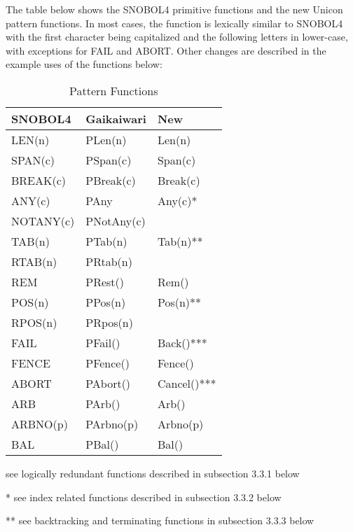 \documentclass{article}
\begin{document}
The table below shows the SNOBOL4 primitive functions and the new Unicon pattern functions.  In most cases, the function is lexically similar to SNOBOL4 with the first character being capitalized and the following letters in lower-case, with exceptions for FAIL and ABORT.  Other changes are described in the example uses of the functions below: 

\begin{table}[ht]
	\centering
	\caption{Pattern Functions}
	\begin{threeparttable}
		\centering
		\begin{tabular}{|l|l|l|}
			\hline\hline
			SNOBOL4 & Gaikaiwari & New \\
			\hline
			LEN(n) & PLen(n) & Len(n) \\
			SPAN(c) & PSpan(c) & Span(c)  \\
			BREAK(c) & PBreak(c) & Break(c) \\
			ANY(c) & PAny & Any(c)* \\
			NOTANY(c) & PNotAny(c) &  \\
			TAB(n) & PTab(n) & Tab(n)** \\
			RTAB(n) & PRtab(n) &  \\
			REM & PRest() & Rem() \\
			POS(n) & PPos(n) & Pos(n)**  \\
			RPOS(n) & PRpos(n) &  \\
			FAIL & PFail() & Back()*** \\
			FENCE & PFence() & Fence() \\
			ABORT & PAbort() & Cancel()*** \\
			ARB & PArb() & Arb() \\
			ARBNO(p) & PArbno(p) & Arbno(p) \\
			BAL & PBal() & Bal() \\
			\hline
		\end{tabular}
		
		\begin{tablenotes}
      		\small
      		\item * see logically redundant functions described in subsection 3.3.1 below
      		\item ** see index related functions described in subsection 3.3.2 below
      		\item *** see backtracking and terminating functions in subsection 3.3.3 below
      	\end{tablenotes}
	\end{threeparttable}
\end{table}
\end{document}
